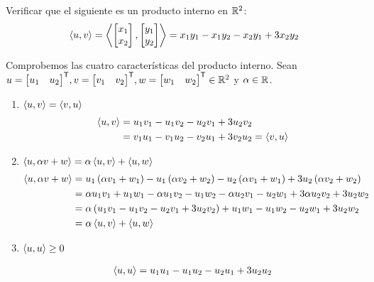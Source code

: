 \begin{exercise}
	Verificar que el siguiente es un producto interno en $\rmath[2]$:
	\[ \inprod{u, v} =\inprod{\begin{bmatrix}
			x_{1} \\ x_{2}
		\end{bmatrix},\begin{bmatrix}
		y_{1} \\ y_{2}
	\end{bmatrix}} = x_{1}y_{1} - x_{1}y_{2} - x_{2}y_{1} + 3x_{2}y_{2} \]
\end{exercise}
\begin{solution}
	Comprobemos las cuatro características del producto interno. Sean $u =\mtrans{\begin{bmatrix}
		u_{1} & u_{2}
	\end{bmatrix}}, v =\mtrans{\begin{bmatrix}
	v_{1} & v_{2}
\end{bmatrix}}, w =\mtrans{\begin{bmatrix}
w_{1} & w_{2}
\end{bmatrix}}\in\rmath[2]$ y $\alpha\in\rmath$.
	\begin{enumerate}
		\item $\inprod{u, v} =\inprod{v, u}$ 
		\begin{align*}
			\inprod{u, v} &= u_{1}v_{1} - u_{1}v_{2} - u_{2}v_{1} + 3u_{2}v_{2}\\
			&= v_{1}u_{1} - v_{1}u_{2} - v_{2}u_{1} + 3v_{2}u_{2} =\inprod{v, u}
		\end{align*}
		\item $\inprod{u, \alpha v + w} =\alpha\inprod{u, v} +\inprod{u, w}$
		\begin{align*}
			\inprod{u, \alpha v + w} &= u_{1}\pa{\alpha v_{1} + w_{1}} - u_{1}\pa{\alpha v_{2} + w_{2}} - u_{2}\pa{\alpha v_{1} + w_{1}} + 3u_{2}\pa{\alpha v_{2} + w_{2}}\\
			&=\alpha u_{1}v_{1} + u_{1}w_{1} -\alpha u_{1}v_{2} - u_{1}w_{2} -\alpha u_{2}v_{1} - u_{2}w_{1} + 3\alpha u_{2}v_{2} + 3u_{2}w_{2}\\
			&=\alpha\pa{u_{1}v_{1} - u_{1}v_{2} - u_{2}v_{1} + 3u_{2}v_{2}} + u_{1}w_{1} - u_{1}w_{2} - u_{2}w_{1} + 3u_{2}w_{2}\\
			&=\alpha\inprod{u, v} +\inprod{u, w}
		\end{align*}
		\item $\inprod{u, u}\geq 0$\par
		\begin{align*}
			\inprod{u, u} &= u_{1}u_{1} - u_{1}u_{2} - u_{2}u_{1} + 3u_{2}u_{2}\\

\end{align*}
\end{enumerate}
\end{solution}
